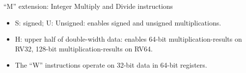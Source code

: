 \documentclass{article}
\newcommand{\hmmmm}{\hspace*{4em}}
\begin{document}
\begin{center}
  {\Huge
    ``M'' extension: Integer Multiply and Divide instructions}

  \vspace*{0.2in}

  \begin{minipage}{9in}\Large
    \hmmmm {}

    \vspace{0.2in}

    \begin{itemize}

    \item S: signed; U: Unsigned: enables signed and unsigned multiplications.

    \item H: upper half of double-width data: enables 64-bit
      multiplication-results on RV32, 128-bit multiplication-results
      on RV64.

    \item The ``W'' instructions operate on 32-bit data in 64-bit registers.

    \end{itemize}
  \end{minipage}
\end{center}

\clearpage

\end{document}
